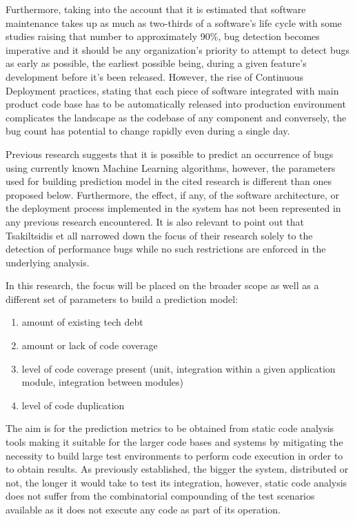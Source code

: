 Furthermore, taking into the account that it is estimated that software maintenance takes up as much as two-thirds of a software's life cycle\cite{duplicateBugDetection} with some studies raising that number to approximately 90\%\cite{reopenedBugsAndMaintenence}, bug detection becomes imperative and it should be any organization's priority to attempt to detect bugs as early as possible, the earliest possible being, during a given feature's development before it's been released. However, the rise of Continuous Deployment practices, stating that each piece of software integrated with main product code base has to be automatically released into production environment complicates the landscape as the codebase of any component and conversely, the bug count has potential to change rapidly even during a single day.

Previous research suggests that it is possible to predict an occurrence of bugs using currently known Machine Learning algorithms\cite{autoDetectionOfPerfBugs}, however, the parameters used for building prediction model in the cited research is different than ones proposed below. Furthermore, the effect, if any, of the software architecture, or the deployment process implemented in the system has not been represented in any previous research encountered. It is also relevant to point out that Tsakiltsidis et all\cite{autoDetectionOfPerfBugs} narrowed down the focus of their research solely to the detection of performance bugs while no such restrictions are enforced in the underlying analysis.

In this research, the focus will be placed on the broader scope as well as a different set of parameters to build a prediction model: 
\begin{enumerate}
\item amount of existing tech debt
\item amount or lack of code coverage
\item level of code coverage present (unit, integration within a given application module, integration between modules)
\item level of code duplication
\end{enumerate}
The aim is for the prediction metrics to be obtained from static code analysis tools making it suitable for the larger code bases and systems by mitigating the necessity to build large test environments to perform code execution in order to to obtain results. As previously established, the bigger the system, distributed or not, the longer it would take to test its integration, however, static code analysis does not suffer from the combinatorial compounding of the test scenarios available as it does not execute any code as part of its operation.

